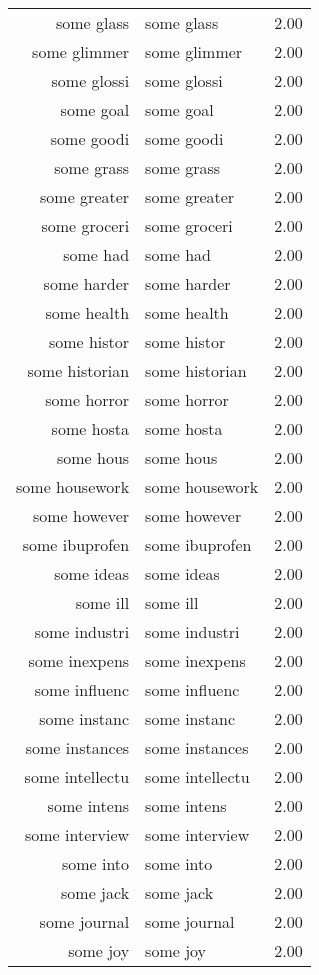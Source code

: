 \begin{table}[ht]
\begin{tabular}{rlr}
  some glass & some glass & 2.00 \\ 
  some glimmer & some glimmer & 2.00 \\ 
  some glossi & some glossi & 2.00 \\ 
  some goal & some goal & 2.00 \\ 
  some goodi & some goodi & 2.00 \\ 
  some grass & some grass & 2.00 \\ 
  some greater & some greater & 2.00 \\ 
  some groceri & some groceri & 2.00 \\ 
  some had & some had & 2.00 \\ 
  some harder & some harder & 2.00 \\ 
  some health & some health & 2.00 \\ 
  some histor & some histor & 2.00 \\ 
  some historian & some historian & 2.00 \\ 
  some horror & some horror & 2.00 \\ 
  some hosta & some hosta & 2.00 \\ 
  some hous & some hous & 2.00 \\ 
  some housework & some housework & 2.00 \\ 
  some however & some however & 2.00 \\ 
  some ibuprofen & some ibuprofen & 2.00 \\ 
  some ideas & some ideas & 2.00 \\ 
  some ill & some ill & 2.00 \\ 
  some industri & some industri & 2.00 \\ 
  some inexpens & some inexpens & 2.00 \\ 
  some influenc & some influenc & 2.00 \\ 
  some instanc & some instanc & 2.00 \\ 
  some instances & some instances & 2.00 \\ 
  some intellectu & some intellectu & 2.00 \\ 
  some intens & some intens & 2.00 \\ 
  some interview & some interview & 2.00 \\ 
  some into & some into & 2.00 \\ 
  some jack & some jack & 2.00 \\ 
  some journal & some journal & 2.00 \\ 
  some joy & some joy & 2.00 \\ 

\end{tabular}
\end{table}
